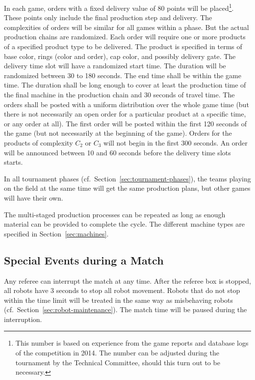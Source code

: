 \documentclass[12pt,twoside]{article}
\newcommand{\refsec}[1]{Section~\ref{#1}}
\begin{document}
In each game, orders with a fixed delivery value of 80 points will be
placed\footnote{This number is based on experience from the game
  reports and database logs of the competition in 2014. The number can
  be adjusted during the tournament by the Technical Committee, should
  this turn out to be necessary.}. These points only include the final
production step and delivery. The complexities of orders will be
similar for all games within a phase. But the actual production chains
are randomized. Each order will require one or more products of a
specified product type to be delivered. The product is specified in
terms of base color, rings (color and order), cap color, and possibly
delivery gate. The delivery time slot will have a randomized start
time. The duration will be randomized between 30 to 180 seconds. The
end time shall be within the game time. The duration shall be long
enough to cover at least the production time of the final machine in
the production chain and 30 seconds of travel time. The orders shall
be posted with a uniform distribution over the whole game time (but
there is not necessarily an open order for a particular product at a
specific time, or any order at all). The first order will be posted
within the first 120 seconds of the game (but not necessarily at the
beginning of the game). Orders for the products of complexity $C_2$ or
$C_3$ will not begin in the first 300 seconds. An order will be
announced between 10 and 60 seconds before the delivery time slots
starts.

In all tournament phases (cf.~\refsec{sec:tournament-phases}), the
teams playing on the field at the same time will get the same
production plans, but other games will have their own.

The multi-staged production processes can be repeated as long as
enough material can be provided to complete the cycle. The different
machine types are specified in Section~\ref{sec:machines}.

\subsection{Special Events during a Match}
\label{sec:during-match}
Any referee can interrupt the match at any time. After the referee box
is stopped, all robots have 3 seconds to stop all robot movement.
Robots that do not stop within the time limit will be treated in the
same way as misbehaving robots (cf.~\refsec{sec:robot-maintenance}).
The match time will be paused during the interruption.
\end{document}
